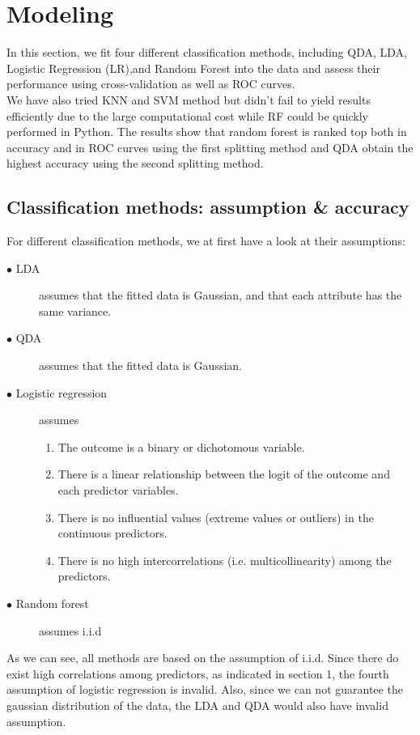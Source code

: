 \documentclass[11pt]{scrartcl} %
\begin{document}
\section{Modeling}
In this section, we fit four different classification methods, including QDA, LDA, Logistic Regression (LR),and Random Forest into the data and assess their performance using cross-validation as well as ROC curves.\\

We have also tried KNN and SVM method but didn't fail to yield results efficiently due to the large computational cost while RF could be quickly performed in Python. The results show that random forest is ranked top both in accuracy and in ROC curves using the first splitting method and QDA obtain the highest accuracy using the second splitting method.\\

\subsection{Classification methods: assumption \& accuracy}
For different classification methods, we at first have a look at their assumptions: 

\begin{description}
\item [$\bullet$ LDA] assumes that the fitted data is Gaussian, and that each attribute has the same variance. 
\item [$\bullet$ QDA] assumes that the fitted data is Gaussian. 
\item [$\bullet$ Logistic regression] assumes

\begin{enumerate}
    \item The outcome is a binary or dichotomous variable.
    \item There is a linear relationship between the logit of the outcome and each predictor variables.
    \item There is no influential values (extreme values or outliers) in the continuous predictors.
    \item There is no high intercorrelations (i.e. multicollinearity) among the predictors.
\end{enumerate}

\item [$\bullet$ Random forest] assumes i.i.d
\end{description}

As we can see, all methods are based on the assumption of i.i.d. Since there do exist high correlations among predictors, as indicated in section 1, the fourth assumption of logistic regression is invalid. Also, since we can not guarantee the gaussian distribution of the data, the LDA and QDA would also have invalid assumption. \\
\end{document}
